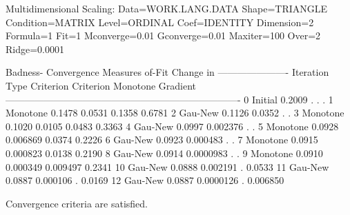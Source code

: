 \documentclass{article}
\begin{document}
\begin{Woutput}
Multidimensional Scaling:  Data=WORK.LANG.DATA
Shape=TRIANGLE Condition=MATRIX Level=ORDINAL
Coef=IDENTITY Dimension=2 Formula=1 Fit=1
 Mconverge=0.01 Gconverge=0.01 Maxiter=100 Over=2 Ridge=0.0001

                          Badness-                  Convergence Measures
                            of-Fit    Change in    ----------------------
Iteration    Type        Criterion    Criterion     Monotone     Gradient
-------------------------------------------------------------------------
      0      Initial        0.2009            .            .            .
      1      Monotone       0.1478       0.0531       0.1358       0.6781
      2      Gau-New        0.1126       0.0352            .            .
      3      Monotone       0.1020       0.0105       0.0483       0.3363
      4      Gau-New        0.0997     0.002376            .            .
      5      Monotone       0.0928     0.006869       0.0374       0.2226
      6      Gau-New        0.0923     0.000483            .            .
      7      Monotone       0.0915     0.000823       0.0138       0.2190
      8      Gau-New        0.0914    0.0000983            .            .
      9      Monotone       0.0910     0.000349     0.009497       0.2341
     10      Gau-New        0.0888     0.002191            .       0.0533
     11      Gau-New        0.0887     0.000106            .       0.0169
     12      Gau-New        0.0887    0.0000126            .     0.006850

Convergence criteria are satisfied.


\end{Woutput}
\end{document}
